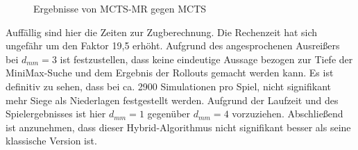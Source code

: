 \documentclass[12pt,a4paper,bibliography=totocnumbered,listof=totocnumbered]{article}
\begin{document}
\begin{figure} [h]
\centering
\begin{minipage}[t]{0.4\textwidth}
\centering
{}
\label{abb:mr-win}
\end{minipage}
\qquad
\begin{minipage}[t]{0.4\textwidth}
\centering
{}
\label{abb:mr-else}
\end{minipage}

\caption{Ergebnisse von MCTS-MR gegen MCTS}
\label{abb:win_mr}
\end{figure}
Auffällig sind hier die Zeiten zur Zugberechnung. Die Rechenzeit hat sich ungefähr um den Faktor 19,5 erhöht. Aufgrund des angesprochenen Ausreißers bei $d_{mm}=3$ ist festzustellen, dass keine eindeutige Aussage bezogen zur Tiefe der MiniMax-Suche und dem Ergebnis der Rollouts gemacht werden kann. Es ist definitiv zu sehen, dass bei ca. 2900 Simulationen pro Spiel, nicht signifikant mehr Siege als Niederlagen festgestellt werden. 
Aufgrund der Laufzeit und des Spielergebnisses ist hier $d_{mm}=1$ gegenüber $d_{mm}=4$ vorzuziehen. Abschließend ist anzunehmen, dass dieser Hybrid-Algorithmus nicht signifikant besser als seine klassische Version ist.\\
\end{document}
